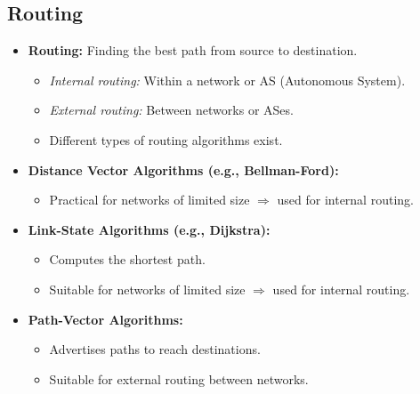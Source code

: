 \subsection{Routing}
\begin{itemize}
    \item \textbf{Routing:} Finding the best path from source to destination.
    \begin{itemize}
        \item \textit{Internal routing:} Within a network or AS (Autonomous System).
        \item \textit{External routing:} Between networks or ASes.
        \item Different types of routing algorithms exist.
    \end{itemize}
    \item \textbf{Distance Vector Algorithms (e.g., Bellman-Ford):}
    \begin{itemize}
        \item Practical for networks of limited size $\Rightarrow$ used for internal routing.
    \end{itemize}
    \item \textbf{Link-State Algorithms (e.g., Dijkstra):}
    \begin{itemize}
        \item Computes the shortest path.
        \item Suitable for networks of limited size $\Rightarrow$ used for internal routing.
    \end{itemize}
    \item \textbf{Path-Vector Algorithms:}
    \begin{itemize}
        \item Advertises paths to reach destinations.
        \item Suitable for external routing between networks.
    \end{itemize}
\end{itemize}

